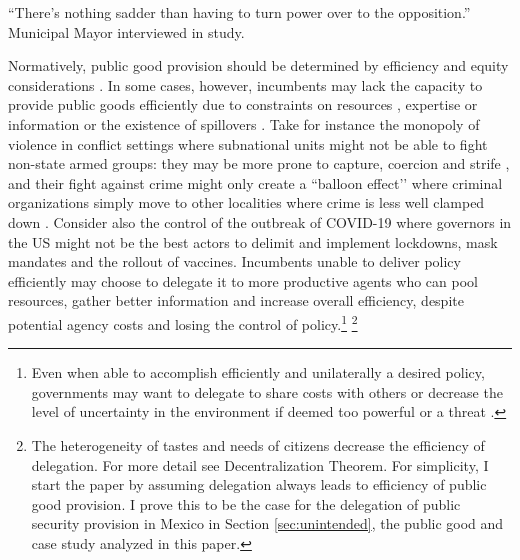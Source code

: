 \documentclass[12pt]{amsart}
\numberwithin{equation}{section}
\theoremstyle{definition}
\theoremstyle{definition}
\theoremstyle{definition}
\begin{document}
\begin{flushright}
	``There's nothing sadder than having to turn power over to the opposition.'' \\
	 Municipal Mayor interviewed in \citet{grindle_2009} study.  
\end{flushright}
\bigskip

     
Normatively, public good provision should be determined by efficiency and equity considerations \citep{oates_1972, Musgrave_1959, Musgrave_1983, gramlich_1977}. In some cases, however, incumbents may lack the capacity to provide public goods efficiently due to constraints on resources \citep{Moravcsik_2000}, expertise or information \citet{Rodrick_1996} or the existence of spillovers \citep{oates_1972,  Besley_case_1995}. Take for instance the monopoly of violence in conflict settings where subnational units might not be able to fight non-state armed groups: they may be more prone to capture, coercion and strife \citet{chacon_2018}, and their fight against crime might only create a ``balloon effect’’ where criminal organizations simply move to other localities where crime is less well clamped down \citep{shirk_wallman_2015}. Consider also the control of the outbreak of COVID-19 where governors in the US might not be the best actors to delimit and implement lockdowns, mask mandates and the rollout of vaccines. Incumbents unable to deliver policy efficiently may choose to delegate it to more productive agents who can pool resources, gather better information and increase overall efficiency, despite potential agency costs and losing the control of policy.\footnote{Even when able to accomplish efficiently and unilaterally a desired policy, governments may want to delegate to share costs with others \citep{Moravcsik_2000} or decrease the level of uncertainty in the environment if deemed too powerful or a threat \citep{lake_2009, milner_2011}.} \footnote{The heterogeneity of tastes and needs of citizens decrease the efficiency of delegation. For more detail see \citet{oates_1972} Decentralization Theorem. For simplicity, I start the paper by assuming delegation always leads to efficiency of public good provision. I prove this to be the case for the delegation of public security provision in Mexico in Section \ref{sec:unintended}, the public good and case study analyzed in this paper.} 
         
\end{document}
